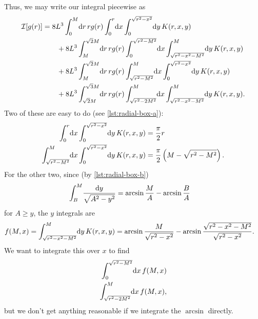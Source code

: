 Thus, we may write our integral piecewise as
\begin{align}
	\mathcal{I}[g(r)]
	&= 8 L^3 \int_0^M\! \dif r \, r g(r) \int_0^r\! \dif x
			\int_0^{\sqrt{r^2 - x^2}}\! \dif y \, K(r, x, y) \notag \\
	&\qquad
		+ 8 L^3 \int_M^{\sqrt{2} M}\! \dif r \, r g(r)
			\int_0^{\sqrt{r^2 - M^2}}\! \dif x
				\int_{\sqrt{r^2 - x^2 - M^2}}^M\! \dif y \, K(r, x, y) \notag \\
	&\qquad
		+ 8 L^3 \int_M^{\sqrt{2} M}\! \dif r \, r g(r)
			\int_{\sqrt{r^2 - M^2}}^M\! \dif x
				\int_0^{\sqrt{r^2 - x^2}}\! \dif y \, K(r, x, y) \notag \\
	&\qquad
		+ 8 L^3 \int_{\sqrt{2} M}^{\sqrt{3} M}\! \dif r \, r g(r) \int_{\sqrt{r^2 - 2 M^2}}^M\! \dif x
				\int_{\sqrt{r^2 - x^2 - M^2}}^M\! \dif y \, K(r, x, y).
\end{align}
Two of these are easy to do (see \vref{lst:radial-box-a}):
\begin{subequations} \label{eq:radial-box-a}
\begin{align}
	\int_0^r\! \dif x \int_0^{\sqrt{r^2 - x^2}}\! \dif y \, K(r, x, y)
	&= \frac{\pi}{2} r \\
	\int_{\sqrt{r^2 - M^2}}^M\! \dif x \int_0^{\sqrt{r^2 - x^2}}\! \dif y \, K(r, x, y)
	&= \frac{\pi}{2} \left( M - \sqrt{r^2 - M^2} \right).
\end{align}
\end{subequations}
For the other two, since (by \vref{lst:radial-box-b})
\begin{align}
	\int_B^M\! \frac{\dif y}{\sqrt{A^2 - y^2}}
	&= \arcsin{\frac{M}{A}} - \arcsin{\frac{B}{A}}
		\label{eq:radial-box-b}
\end{align}
for $A \ge y$, the $y$ integrals are
\begin{align}
	f(M, x)
	&= \int_{\sqrt{r^2 - x^2 - M^2}}^M\! \dif y \, K(r, x, y)
	= \arcsin{\frac{M}{\sqrt{r^2 - x^2}}} - \arcsin{\frac{\sqrt{r^2 - x^2 - M^2}}{\sqrt{r^2 - x^2}}}.
\end{align}
We want to integrate this over $x$ to find
\begin{subequations}
\begin{align}
	\int_0^{\sqrt{r^2 - M^2}}\! \dif x \, f(M, x)
		\label{eq:radial-box-bad-integral-a} \\
	\int_{\sqrt{r^2 - 2 M^2}}^M\! \dif x \, f(M, x),
		\label{eq:radial-box-bad-integral-b}
\end{align}
\end{subequations}
but we don't get anything reasonable if we integrate the $\arcsin$ directly.

